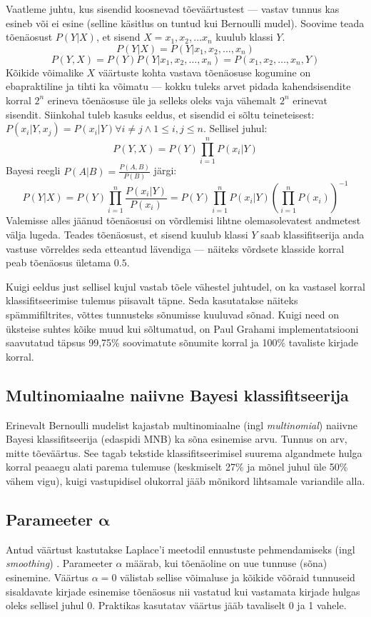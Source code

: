 \documentclass[]{trkuur}
\let\eng\emph
\begin{document}
Vaatleme juhtu, kus sisendid koosnevad tõeväärtustest --- vastav tunnus kas esineb või ei
esine (selline käsitlus on tuntud kui Bernoulli mudel).
Soovime teada tõenäosust \( P(Y \vert X) \), et sisend \( X = x_1, x_2, \dots
x_n \)
kuulub klassi \( Y \).
\[ P(Y \vert X) = P(Y \vert x_1,x_2,\dots,x_n) \]
\[ P(Y,X) = P(Y)P(Y \vert x_1,x_2,\dots,x_n) = P(x_1,x_2,\dots,x_n,Y) \]
Kõikide võimalike \(X\) väärtuste kohta vastava tõenäosuse kogumine on
ebapraktiline ja tihti ka võimatu --- kokku tuleks arvet pidada kahendsisendite
korral \(2^n\) erineva tõenäosuse üle ja selleks oleks vaja vähemalt \(2^n\)
erinevat sisendit. Siinkohal tuleb kasuks eeldus, et sisendid ei sõltu
teineteisest: \( P(x_i \vert Y,x_j) = P(x_i \vert Y) \forall i \neq j \wedge 1
\le i,j\le n \). Sellisel juhul:
\[ P(Y,X) = P(Y) \prod_{i=1}^n P(x_i \vert Y) \]
Bayesi reegli \( P(A|B) = \frac{P(A,B)}{P(B)} \) järgi:
\[ P(Y \vert X) = P(Y) \prod_{i=1}^n \frac{P(x_i \vert Y)}{P(x_i)} = P(Y)
\prod_{i=1}^n P(x_i \vert Y)  \left(\prod_{i=1}^n  P(x_i)\right)^{-1} \]
Valemisse alles jäänud tõenäosusi on võrdlemisi lihtne olemasolevatest
andmetest välja lugeda. Teades tõenäosust, et sisend kuulub klassi \(Y\)
saab klassifitserija anda vastuse võrreldes seda etteantud lävendiga ---
näiteks võrdsete klasside korral peab tõenäosus ületama \(0.5\).

Kuigi eeldus just sellisel kujul vastab tõele vähestel juhtudel, on ka vastasel
korral klassifitseerimise tulemus piisavalt täpne. Seda kasutatakse näiteks
spämmifiltrites, võttes tunnusteks sõnumisse kuuluvad sõnad. Kuigi need on
üksteise suhtes kõike muud kui sõltumatud, on Paul Grahami implementatsiooni
saavutatud täpsus 99,75\% soovimatute sõnumite korral ja 100\% tavaliste kirjade
korral. \autocite{improvedbayesianfiltering}

\subsection{Multinomiaalne naiivne Bayesi klassifitseerija}
Erinevalt Bernoulli mudelist kajastab multinomiaalne (ingl \eng{multinomial}) naiivne Bayesi klassifitseerija (edaspidi MNB) ka sõna
esinemise arvu. Tunnus on arv, mitte tõeväärtus. See tagab tekstide
klassifitseerimisel suurema algandmete hulga korral peaaegu alati parema tulemuse
(keskmiselt 27\% ja mõnel juhul üle 50\% vähem vigu), kuigi vastupidisel olukorral jääb
mõnikord lihtsamale variandile alla.
\autocite{McCallum98acomparison}

\subsection[Parameeter \(\alpha\)]{Parameeter \(\boldsymbol{\alpha}\)}
Antud väärtust kastutakse Laplace'i meetodil ennustuste pehmendamiseks (ingl \eng{smoothing}) \autocite{sklearnMNB}.
Parameeter \( \alpha \) määrab, kui tõenäoline on uue tunnuse (sõna) esinemine.
Väärtus \( \alpha = 0 \) välistab sellise võimaluse ja kõikide võõraid tunnuseid
sisaldavate kirjade esinemise tõenäosus nii vastatud kui vastamata kirjade hulgas
oleks sellisel juhul 0. Praktikas kasutatav väärtus jääb tavaliselt 0 ja 1 vahele.
\autocite{wikiAddSmooth}
\end{document}
